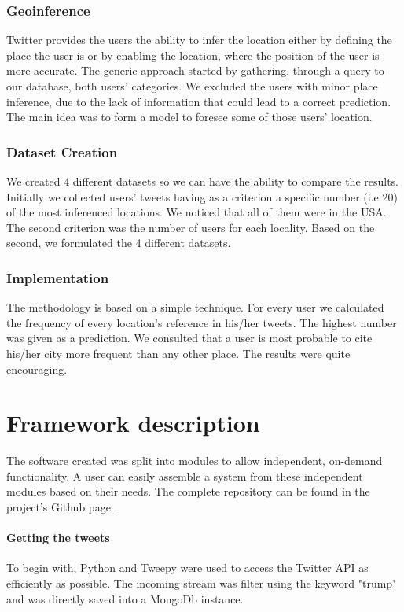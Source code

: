\documentclass[12pt,svgnames]{report}
\begin{document}
\subsection*{Geoinference}
Twitter provides the users the ability to infer the location either by defining the place the user is or by enabling the location, where the position of the user is more accurate. The generic approach started by gathering, through a query to our database, both users' categories. We excluded the users with minor place inference, due to the lack of information that could lead to a correct prediction. The main idea was to form a model to foresee some of those users' location.

\subsection*{Dataset Creation}
We created 4 different datasets so we can have the ability to compare the results. Initially we collected users' tweets having as a criterion a specific number (i.e 20) of the most inferenced locations. We noticed that all of them were in the USA. The second criterion was the number of users for each locality. Based on the second, we formulated the 4 different datasets. 

\subsection*{Implementation}
The methodology is based on a simple technique. For every user we calculated the frequency of every location's reference in his/her tweets. The highest number was given as a prediction. We consulted that a user is most probable to cite his/her city more frequent than any other place. The results were quite encouraging.

\chapter{Framework description}
\label{chap:framework}
The software created was split into modules to allow independent, on-demand functionality. A user can easily assemble a system from these independent modules based on their needs. The complete repository can be found in the project's Github page \cite{projectgithub}.
\subsubsection*{Getting the tweets}
To begin with, Python and Tweepy \cite{tweepy} were used to access the Twitter API as efficiently as possible. The incoming stream was filter using the keyword "trump" and was directly saved into a MongoDb instance.
\end{document}
